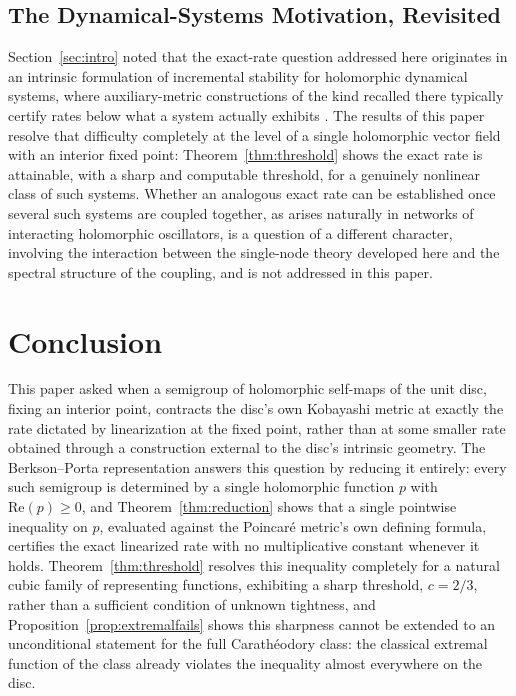 \documentclass[pdflatex,sn-mathphys-num]{sn-jnl}%
\theoremstyle{thmstyleone}%
\theoremstyle{thmstyletwo}%
\theoremstyle{thmstylethree}%
\begin{document}
\subsection{The Dynamical-Systems Motivation, Revisited}

Section~\ref{sec:intro} noted that the exact-rate question addressed here originates in an intrinsic formulation of incremental stability for holomorphic dynamical systems, where auxiliary-metric constructions of the kind recalled there typically certify rates below what a system actually exhibits \cite{lohmiller1998contraction}. The results of this paper resolve that difficulty completely at the level of a single holomorphic vector field with an interior fixed point: Theorem~\ref{thm:threshold} shows the exact rate is attainable, with a sharp and computable threshold, for a genuinely nonlinear class of such systems. Whether an analogous exact rate can be established once several such systems are coupled together, as arises naturally in networks of interacting holomorphic oscillators, is a question of a different character, involving the interaction between the single-node theory developed here and the spectral structure of the coupling, and is not addressed in this paper.

%
%
%

\section{Conclusion}
\label{sec:conclusion}

This paper asked when a semigroup of holomorphic self-maps of the unit disc, fixing an interior point, contracts the disc's own Kobayashi metric at exactly the rate dictated by linearization at the fixed point, rather than at some smaller rate obtained through a construction external to the disc's intrinsic geometry. The Berkson--Porta representation answers this question by reducing it entirely: every such semigroup is determined by a single holomorphic function $p$ with $\mathrm{Re}(p)\ge0$, and Theorem~\ref{thm:reduction} shows that a single pointwise inequality on $p$, evaluated against the Poincar\'e metric's own defining formula, certifies the exact linearized rate with no multiplicative constant whenever it holds. Theorem~\ref{thm:threshold} resolves this inequality completely for a natural cubic family of representing functions, exhibiting a sharp threshold, $c=2/3$, rather than a sufficient condition of unknown tightness, and Proposition~\ref{prop:extremalfails} shows this sharpness cannot be extended to an unconditional statement for the full Carath\'eodory class: the classical extremal function of the class already violates the inequality almost everywhere on the disc.
\end{document}
